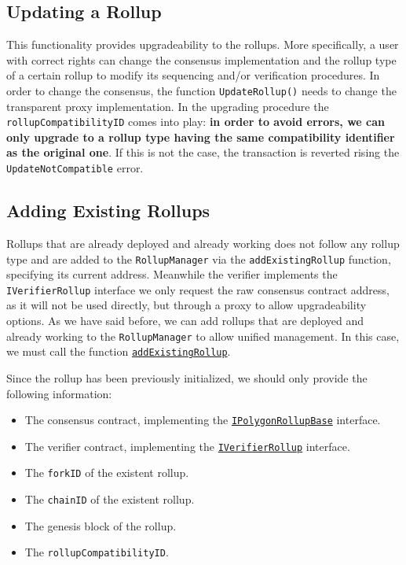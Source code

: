\subsection{Updating a Rollup}

This functionality provides upgradeability to the rollups. More specifically, a user with correct rights can change the consensus implementation and the rollup type of a certain rollup to modify its sequencing and/or verification procedures. In order to change the consensus, the function \texttt{UpdateRollup()} needs to change the transparent proxy implementation. In the upgrading procedure the \texttt{rollupCompatibilityID} comes into play: \textbf{in order to avoid errors, we can only upgrade to a rollup type having the same compatibility identifier as the original one}. If this is not the case, the transaction is reverted rising the \texttt{UpdateNotCompatible} error.




\subsection{Adding Existing Rollups}


Rollups that are already deployed and already working does not follow any rollup type and are added to the \texttt{RollupManager} via the \texttt{addExistingRollup} function, specifying its current address. Meanwhile the verifier implements the \texttt{IVerifierRollup} interface we only request the raw consensus contract address, as it will not be used directly, but through a proxy to allow upgradeability options. As we have said before, we can add rollups that are deployed and already working to the \texttt{RollupManager} to allow unified management. In this case, we must call the function  \href{https://github.com/0xPolygonHermez/zkevm-contracts/blob/8fc03b0e83cbb143fdc6c1ecfaafa5c294c25509/contracts/v2/PolygonRollupManager.sol\#L640C14-L640C31}{\texttt{addExistingRollup}}.

Since the rollup has been previously initialized, we should only provide the following information:

\begin{itemize}
\item The consensus contract, implementing the \href{https://github.com/0xPolygonHermez/zkevm-contracts/blob/develop/contracts/v2/interfaces/IPolygonRollupBase.sol}{\texttt{IPolygonRollupBase}} interface.
\item The verifier contract, implementing the \href{https://github.com/0xPolygonHermez/zkevm-contracts/blob/develop/contracts/interfaces/IVerifierRollup.sol}{\texttt{IVerifierRollup}} interface.
\item The \texttt{forkID} of the existent rollup.
\item The \texttt{chainID} of the existent rollup.
\item The genesis block of the rollup.
\item The \texttt{rollupCompatibilityID}.
\end{itemize}

